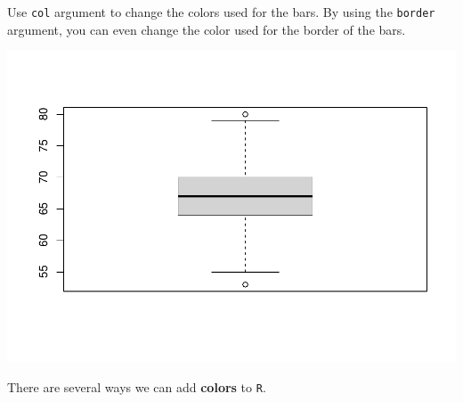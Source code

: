\documentclass[
]{book}
\newenvironment{Shaded}{\begin{snugshade}}{\end{snugshade}}
\newcommand{\DataTypeTok}[1]{\textcolor[rgb]{0.13,0.29,0.53}{#1}}
\newcommand{\DecValTok}[1]{\textcolor[rgb]{0.00,0.00,0.81}{#1}}
\newcommand{\KeywordTok}[1]{\textcolor[rgb]{0.13,0.29,0.53}{\textbf{#1}}}
\newcommand{\NormalTok}[1]{#1}
\newcommand{\OperatorTok}[1]{\textcolor[rgb]{0.81,0.36,0.00}{\textbf{#1}}}
\newcommand{\StringTok}[1]{\textcolor[rgb]{0.31,0.60,0.02}{#1}}
\begin{document}
Use \texttt{col} argument to change the colors used for the bars. By using the \texttt{border} argument, you can even change the color used for the border of the bars.

\begin{Shaded}
\end{Shaded}

\includegraphics{_main_files/figure-latex/unnamed-chunk-226-1.pdf}

There are several ways we can add \textbf{colors} to \texttt{R}.
\end{document}
